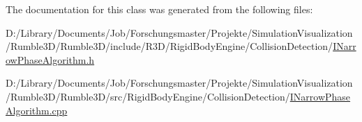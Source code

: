 The documentation for this class was generated from the following files\+:\begin{DoxyCompactItemize}
\item 
D\+:/\+Library/\+Documents/\+Job/\+Forschungsmaster/\+Projekte/\+Simulation\+Visualization/\+Rumble3\+D/\+Rumble3\+D/include/\+R3\+D/\+Rigid\+Body\+Engine/\+Collision\+Detection/\mbox{\hyperlink{_i_narrow_phase_algorithm_8h}{I\+Narrow\+Phase\+Algorithm.\+h}}\item 
D\+:/\+Library/\+Documents/\+Job/\+Forschungsmaster/\+Projekte/\+Simulation\+Visualization/\+Rumble3\+D/\+Rumble3\+D/src/\+Rigid\+Body\+Engine/\+Collision\+Detection/\mbox{\hyperlink{_i_narrow_phase_algorithm_8cpp}{I\+Narrow\+Phase\+Algorithm.\+cpp}}\end{DoxyCompactItemize}
